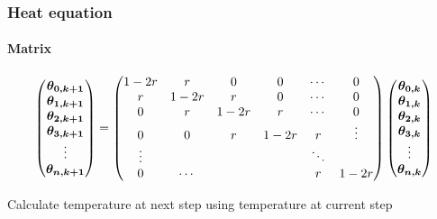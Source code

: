 \documentclass[aspectratio=169]{beamer}
\newcommand{\bvec}[1]{\mbox{\boldmath $#1$}}
\begin{document}
\begin{frame}
    \frametitle{Heat equation}
    \framesubtitle{Matrix}
    \begin{equation}
        \begin{pmatrix}
            \bvec{\theta_{0, k+1}} \\
            \bvec{\theta_{1, k+1}} \\
            \bvec{\theta_{2, k+1}} \\
            \bvec{\theta_{3, k+1}} \\
            \vdots \\
            \bvec{\theta_{n, k+1}} \\
        \end{pmatrix}
         = 
        \begin{pmatrix}
            1 - 2r & r & 0 & 0 & \cdots & 0 \\
            r & 1 - 2r & r & 0 & \cdots & 0 \\
            0 & r & 1 - 2r & r & \cdots & 0 \\
            0 & 0 & r & 1 - 2r & r & \vdots \\
            \vdots & & & & \ddots \\
            0 & \cdots & & & r & 1-2r 
        \end{pmatrix}
        \begin{pmatrix}
            \bvec{\theta_{0, k}} \\
            \bvec{\theta_{1, k}} \\
            \bvec{\theta_{2, k}} \\
            \bvec{\theta_{3, k}} \\
            \vdots \\
            \bvec{\theta_{n, k}} \\
            
        \end{pmatrix}
    \end{equation}

    \vspace{5mm}
    \centering
    Calculate temperature at next step using temperature at current step
\end{frame}
\end{document}
